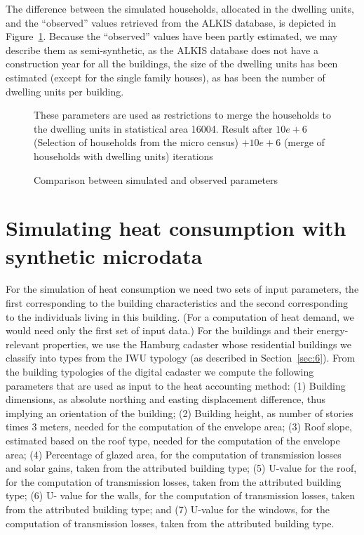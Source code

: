 \documentclass[11pt]{IJM-article}
\begin{document}
The difference between the simulated households, allocated in the dwelling
units, and the ``observed'' values retrieved from the ALKIS database, is
depicted in Figure~\ref{fig:6}. Because the ``observed'' values have been
partly estimated, we may describe them as semi-synthetic, as the ALKIS database
does not have a construction year for all the buildings, the size of the
dwelling units has been estimated (except for the single family houses), as has
been the number of dwelling units per building.\\

\begin{figure}[htb]
    \centering 
    \caption{Comparison between simulated and observed parameters} 
    \label{fig:6} 
    
    \begin{flushleft}
    \begin{footnotesize}
    These parameters are used as restrictions to merge the households to the
    dwelling units in statistical area 16004.  Result after $10e+6$ (Selection
    of households from the micro census) $+ 10e+6$ (merge of households with
    dwelling units) iterations
    \end{footnotesize}
    \end{flushleft}
\end{figure}

\section{Simulating heat consumption with synthetic microdata}
\label{sec:8}

For the simulation of heat consumption we need two sets of input parameters,
the first corresponding to the building characteristics and the second
corresponding to the individuals living in this building. (For a computation of
heat demand, we would need only the first set of input data.) For the buildings
and their energy-relevant properties, we use the Hamburg cadaster whose
residential buildings we classify into types from the IWU typology (as
described in Section~\ref{sec:6}). From the building typologies of the digital
cadaster we compute the following parameters that are used as input to the heat
accounting method: (1) Building dimensions, as absolute northing and easting
displacement difference, thus implying an orientation of the building; (2)
Building height, as number of stories times 3 meters, needed for the
computation of the envelope area; (3) Roof slope, estimated based on the roof
type, needed for the computation of the envelope area; (4) Percentage of glazed
area, for the computation of transmission losses and solar gains, taken from
the attributed building type; (5) U-value for the roof, for the computation of
transmission losses, taken from the attributed building type; (6) U- value for
the walls, for the computation of transmission losses, taken from the
attributed building type; and (7) U-value for the windows, for the computation
of transmission losses, taken from the attributed building type.\\
\end{document}
